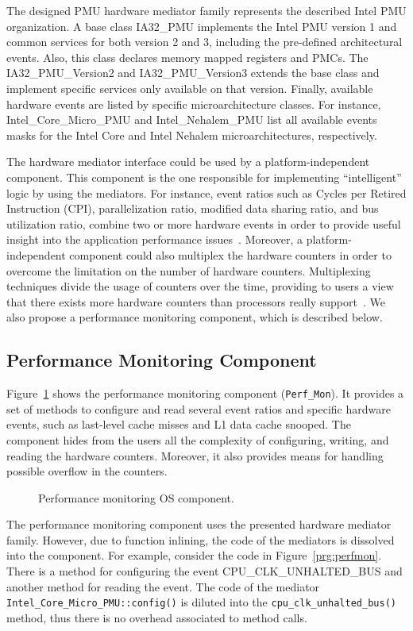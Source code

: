\documentclass[conference]{IEEEtran}
\newcommand{\fig}[4][ht!]{
	\begin{figure}[#1]
	{\centering{\texttt{[image: fig/\#2]}}\par}
	\caption{#3}
	\label{fig:#2}
	\end{figure}
}
\begin{document}
The designed PMU hardware mediator family represents the described Intel PMU organization. A base class IA32\_PMU implements the Intel PMU version 1 and common services for both version 2 and 3, including the pre-defined architectural events. Also, this class declares memory mapped registers and PMCs. The IA32\_PMU\_Version2 and IA32\_PMU\_Version3 extends the base class and implement specific services only available on that version. Finally, available hardware events are listed by specific microarchitecture classes. For instance, Intel\_Core\_Micro\_PMU and Intel\_Nehalem\_PMU list all available events masks for the Intel Core and Intel Nehalem microarchitectures, respectively.

The hardware mediator interface could be used by a platform-independent component. This component is the one responsible for implementing ``intelligent'' logic by using the mediators. For instance, event ratios such as Cycles per Retired Instruction (CPI), parallelization ratio, modified data sharing ratio, and bus utilization ratio, combine two or more hardware events in order to provide useful insight into the application performance issues~\cite{intelperf}. Moreover, a platform-independent component could also multiplex the hardware counters in order to overcome the limitation on the number of hardware counters. Multiplexing techniques divide the usage of counters over the time, providing to users a view that there exists more hardware counters than processors really support~\cite{Dongarra:2003}. We also propose a performance monitoring component, which is described below.

\subsection{Performance Monitoring Component}

Figure~\ref{fig:perf_mon} shows the performance monitoring component (\texttt{Perf\_Mon}). It provides a set of methods to configure and read several event ratios and specific hardware events, such as last-level cache misses and L1 data cache snooped. The component hides from the users all the complexity of configuring, writing, and reading the hardware counters. Moreover, it also provides means for handling possible overflow in the counters.

\fig{perf_mon}{Performance monitoring OS component.}{scale=.38}

The performance monitoring component uses the presented hardware mediator family. However, due to function inlining, the code of the mediators is dissolved into the component. For example, consider the code in Figure~\ref{prg:perfmon}. There is a method for configuring the event CPU\_CLK\_UNHALTED\_BUS and another method for reading the event. The code of the mediator \texttt{Intel\_Core\_Micro\_PMU::config()} is diluted into the \texttt{cpu\_clk\_unhalted\_bus()} method, thus there is no overhead associated to method calls.
\end{document}
